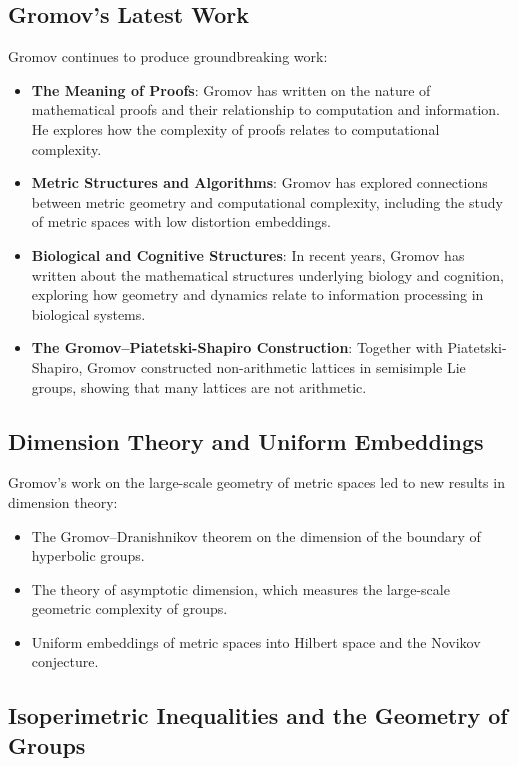 \subsection{Gromov's Latest Work}

Gromov continues to produce groundbreaking work:
\begin{itemize}
\item \textbf{The Meaning of Proofs}: Gromov has written on the nature of mathematical proofs and their relationship to computation and information. He explores how the complexity of proofs relates to computational complexity.
\item \textbf{Metric Structures and Algorithms}: Gromov has explored connections between metric geometry and computational complexity, including the study of metric spaces with low distortion embeddings.
\item \textbf{Biological and Cognitive Structures}: In recent years, Gromov has written about the mathematical structures underlying biology and cognition, exploring how geometry and dynamics relate to information processing in biological systems.
\item \textbf{The Gromov--Piatetski-Shapiro Construction}: Together with Piatetski-Shapiro, Gromov constructed non-arithmetic lattices in semisimple Lie groups, showing that many lattices are not arithmetic.
\end{itemize}

\subsection{Dimension Theory and Uniform Embeddings}

Gromov's work on the large-scale geometry of metric spaces led to new results in dimension theory:
\begin{itemize}
\item The Gromov--Dranishnikov theorem on the dimension of the boundary of hyperbolic groups.
\item The theory of asymptotic dimension, which measures the large-scale geometric complexity of groups.
\item Uniform embeddings of metric spaces into Hilbert space and the Novikov conjecture.
\end{itemize}

\subsection{Isoperimetric Inequalities and the Geometry of Groups}

